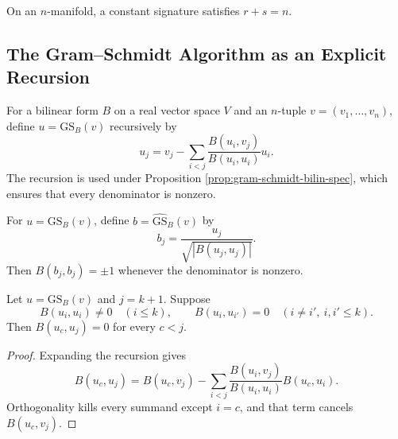 On an $n$-manifold, a constant signature satisfies $r+s=n$.

\subsection{The Gram--Schmidt Algorithm as an Explicit Recursion}

\begin{definition}
\label{def:gram-schmidt-bilin}




For a bilinear form $B$ on a real vector space $V$ and an $n$-tuple
$v=(v_1,\ldots,v_n)$, define $u=\mathrm{GS}_B(v)$ recursively by
\[
u_j=v_j-\sum_{i<j}\frac{B(u_i,v_j)}{B(u_i,u_i)}u_i.
\]
The recursion is used under Proposition \ref{prop:gram-schmidt-bilin-spec}, which
ensures that every denominator is nonzero.
\end{definition}

\begin{definition}
\label{def:gram-schmidt-bilin-normed}





For $u=\mathrm{GS}_B(v)$, define $b=\widehat{\mathrm{GS}}_B(v)$ by
\[
b_j=\frac{u_j}{\sqrt{|B(u_j,u_j)|}}.
\]
Then $B(b_j,b_j)=\pm1$ whenever the denominator is nonzero.
\end{definition}

\begin{lemma}
\label{lem:gram-schmidt-bilin-orthogonal-earlier}





Let $u=\mathrm{GS}_B(v)$ and $j=k+1$. Suppose
\[
B(u_i,u_i)\ne0\quad(i\leq k),
\qquad B(u_i,u_{i'})=0\quad(i\ne i',\ i,i'\leq k).
\]
Then $B(u_c,u_j)=0$ for every $c<j$.
\end{lemma}

\begin{proof}

\sketch Expanding the recursion gives
\[
B(u_c,u_j)=B(u_c,v_j)-\sum_{i<j}
\frac{B(u_i,v_j)}{B(u_i,u_i)}B(u_c,u_i).
\]
Orthogonality kills every summand except $i=c$, and that term cancels
$B(u_c,v_j)$.
\end{proof}

